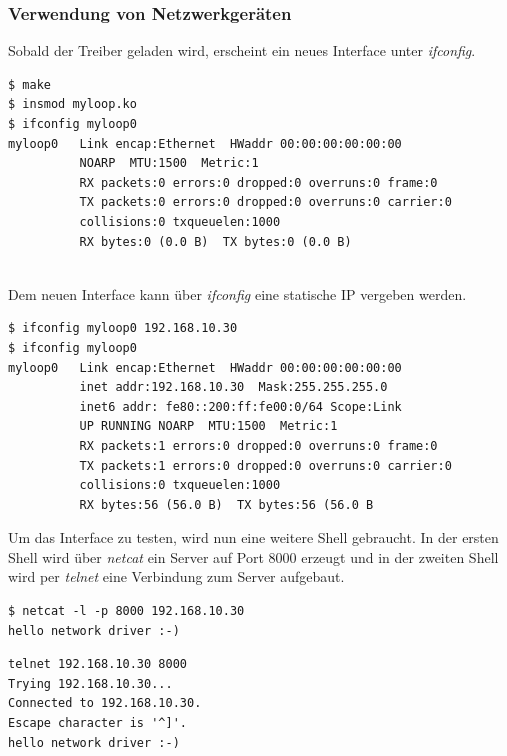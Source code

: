 \subsubsection{Verwendung von Netzwerkgeräten}

Sobald der Treiber geladen wird, erscheint ein neues Interface unter \emph{ifconfig}.
\begin{lstlisting}
$ make
$ insmod myloop.ko
$ ifconfig myloop0
myloop0   Link encap:Ethernet  HWaddr 00:00:00:00:00:00  
          NOARP  MTU:1500  Metric:1
          RX packets:0 errors:0 dropped:0 overruns:0 frame:0
          TX packets:0 errors:0 dropped:0 overruns:0 carrier:0
          collisions:0 txqueuelen:1000 
          RX bytes:0 (0.0 B)  TX bytes:0 (0.0 B)


\end{lstlisting}

Dem neuen Interface kann über \emph{ifconfig} eine statische IP vergeben werden.
\begin{lstlisting}
$ ifconfig myloop0 192.168.10.30
$ ifconfig myloop0
myloop0   Link encap:Ethernet  HWaddr 00:00:00:00:00:00  
          inet addr:192.168.10.30  Mask:255.255.255.0
          inet6 addr: fe80::200:ff:fe00:0/64 Scope:Link
          UP RUNNING NOARP  MTU:1500  Metric:1
          RX packets:1 errors:0 dropped:0 overruns:0 frame:0
          TX packets:1 errors:0 dropped:0 overruns:0 carrier:0
          collisions:0 txqueuelen:1000 
          RX bytes:56 (56.0 B)  TX bytes:56 (56.0 B
\end{lstlisting}

Um das Interface zu testen, wird nun eine weitere Shell gebraucht. In der ersten Shell wird über \emph{netcat} ein Server auf Port 8000 erzeugt und in der zweiten
Shell wird per \emph{telnet} eine Verbindung zum Server aufgebaut.

\begin{minipage}[t]{0.45\textwidth}
\begin{lstlisting}[caption=Server]
$ netcat -l -p 8000 192.168.10.30
hello network driver :-)
\end{lstlisting}
\end{minipage}
\begin{minipage}[t]{0.1\textwidth}
\hspace{1cm}
\end{minipage}
\begin{minipage}[t]{0.45\textwidth}
\begin{lstlisting}[caption=Client]
telnet 192.168.10.30 8000
Trying 192.168.10.30...
Connected to 192.168.10.30.
Escape character is '^]'.
hello network driver :-)
\end{lstlisting}
\end{minipage}

